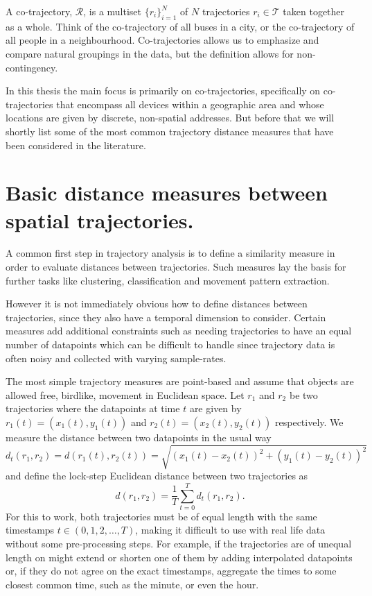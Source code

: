 \documentclass[../main.tex]{subfiles}
\begin{document}
A co-trajectory, $\mathcal{R}$, is a multiset $\{r_i\}^N_{i=1}$ of $N$ trajectories $r_i \in \mathcal{T}$ taken together as a whole. Think of the co-trajectory of all buses in a city, or the co-trajectory of all people in a neighbourhood. Co-trajectories allows us to emphasize and compare natural groupings in the data, but the definition allows for non-contingency.

In this thesis the main focus is primarily on co-trajectories, specifically 
on co-trajectories that encompass all devices within a geographic area and 
whose locations are given by discrete, non-spatial addresses. But before that
we will shortly list some of the most common trajectory distance measures that have been considered in the literature.

\section{Basic distance measures between spatial trajectories.}

A common first step in trajectory analysis is to
define a similarity measure in order to evaluate 
distances between trajectories. Such measures 
lay the basis for further tasks like clustering,
classification and movement pattern extraction.  

However it is not immediately obvious how to define 
distances between trajectories, since they also have
a temporal dimension to consider. Certain measures 
add additional constraints such as needing trajectories
to have an equal number of datapoints which can be difficult
to handle since trajectory data is often noisy and collected
with varying sample-rates. 

The most simple trajectory measures are point-based and assume
that objects are allowed free, birdlike, movement in Euclidean 
space. Let $r_1$ and $r_2$ be two trajectories where the datapoints
at time $t$ are given by $r_1(t) = (x_1(t), y_1(t))$ and 
$r_2(t) = (x_2(t), y_2(t))$ respectively. We measure the distance
between two datapoints in the usual way
$$
d_t(r_1,r_2) = d(r_1(t), r_2(t)) = \sqrt{(x_1(t) - x_2(t))^2+(y_1(t) - y_2(t))^2}
$$
and define the lock-step Euclidean distance between two trajectories as
$$
d(r_1,r_2) = \frac{1}{T}\sum_{t=0}^Td_t(r_1,r_2).
$$
For this to work, both trajectories must be of equal length with the same timestamps $t \in (0,1,2,\dots,T)$, making it difficult to use with real life data without some pre-processing steps. For example, if the trajectories are of unequal length on might extend or shorten one of them by adding interpolated datapoints or, if they do not agree on the exact timestamps, aggregate the times to some closest common time, such as the minute, or even the hour.
\end{document}
